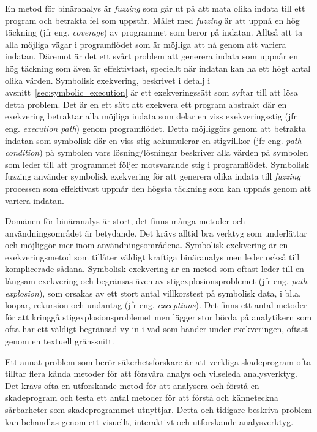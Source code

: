 En metod för binäranalys är \emph{fuzzing} som går ut på att mata olika indata
till ett program och betrakta fel som uppstår. Målet med \emph{fuzzing} är att
uppnå en hög täckning (jfr eng. \emph{coverage}) av programmet som beror
på indatan. Alltså att ta alla möjliga vägar i programflödet som är
möjliga att nå genom att variera indatan. Däremot är det ett svårt problem att
generera indata som uppnår en hög täckning som även är effektivtast, speciellt
när indatan kan ha ett högt antal olika värden. Symbolisk exekvering, beskrivet
i detalj i avsnitt~\ref{sec:symbolic_execution} är ett exekveringssätt som
syftar till att lösa detta problem. Det är en ett sätt att
exekvera ett program abstrakt där en exekvering betraktar alla möjliga indata
som delar en viss exekveringsstig (jfr eng. \emph{execution path}) genom
programflödet. Detta möjliggörs genom att betrakta indatan som symbolisk där
en viss stig ackumulerar en stigvillkor (jfr eng. \emph{path condition}) på
symbolen vars lösning/lösningar beskriver alla värden på symbolen som leder
till att programmet följer motsvarande stig i programflödet. Symbolisk
fuzzing använder symbolisk exekvering för att generera olika indata till
\emph{fuzzing} processen som effektivast uppnår den högsta täckning som kan
uppnås genom att variera indatan.

Domänen för binäranalys är stort, det finns många metoder och
användningsområdet är betydande. Det krävs alltid bra verktyg som underlättar
och möjliggör mer inom användningsområdena. Symbolisk exekvering är en
exekveringsmetod som tillåter väldigt kraftiga binäranalys men leder också till
komplicerade sådana. Symbolisk exekvering är en metod som oftast leder till en
långsam exekvering och begränsas även av stigexplosionsproblemet (jfr eng.
\emph{path explosion}), som orsakas av ett stort antal villkorstest på
symbolisk data, i bl.a. loopar, rekursion och undantag (jfr eng.
\emph{exceptions}). Det finns ett antal metoder för att kringgå
stigexplosionsproblemet men lägger stor börda på analytikern som ofta har ett
väldigt begränsad vy in i vad som händer under exekveringen, oftast genom en
textuell gränssnitt.

Ett annat problem som berör säkerhetsforskare är att verkliga skadeprogram
ofta tilltar flera kända metoder för att försvåra analys och vilseleda
analysverktyg. Det krävs ofta en utforskande metod för att analysera och förstå
en skadeprogram och testa ett antal metoder för att förstå och känneteckna
sårbarheter som skadeprogrammet utnyttjar. Detta och tidigare beskriva
problem kan behandlas genom ett visuellt, interaktivt och utforskande
analysverktyg.

